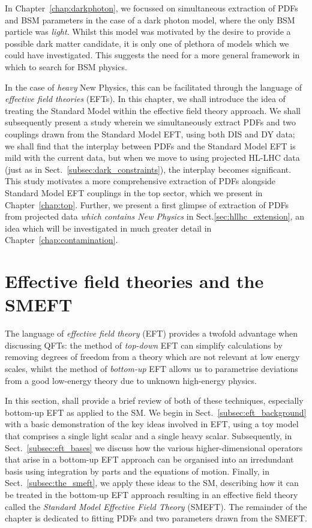 \documentclass[withindex,glossary]{cam-thesis}
\begin{document}
\noindent In Chapter~\ref{chap:darkphoton}, we focussed on simultaneous extraction of PDFs and BSM parameters in the case of a dark photon model, where the only BSM particle was \textit{light}. Whilst this model was motivated by the desire to provide a possible dark matter candidate, it is only one of plethora of models which we could have investigated. This suggests the need for a more general framework in which to search for BSM physics.

In the case of \textit{heavy} New Physics, this can be facilitated through the language of \textit{effective field theories} (EFTs). In this chapter, we shall introduce the idea of treating the Standard Model within the effective field theory approach. We shall subsequently present a study wherein we simultaneously extract PDFs and two couplings drawn from the Standard Model EFT, using both DIS and DY data; we shall find that the interplay between PDFs and the Standard Model EFT is mild with the current data, but when we move to using projected HL-LHC data (just as in Sect.~\ref{subsec:dark_constraints}), the interplay becomes significant. This study motivates a more comprehensive extraction of PDFs alongside Standard Model EFT couplings in the top sector, which we present in Chapter~\ref{chap:top}. Further, we present a first glimpse of extraction of PDFs from projected data \textit{which contains New Physics} in Sect.\ref{sec:hllhc_extension}, an idea which will be investigated in much greater detail in Chapter~\ref{chap:contamination}.

\section{Effective field theories and the SMEFT}
\label{sec:eft_intro}
The language of \textit{effective field theory} (EFT) provides a twofold advantage when discussing QFTs: the method of \textit{top-down} EFT can simplify calculations by removing degrees of freedom from a theory which are not relevant at low energy scales, whilst the method of \textit{bottom-up} EFT allows us to parametrise deviations from a good low-energy theory due to unknown high-energy physics. 

In this section, shall provide a brief review of both of these techniques, especially bottom-up EFT as applied to the SM. We begin in Sect.~\ref{subsec:eft_background} with a basic demonstration of the key ideas involved in EFT, using a toy model that comprises a single light scalar and a single heavy scalar. Subsequently, in Sect.~\ref{subsec:eft_bases} we discuss how the various higher-dimensional operators that arise in a bottom-up EFT approach can be organised into an irredundant basis using integration by parts and the equations of motion. Finally, in Sect.~\ref{subsec:the_smeft}, we apply these ideas to the SM, describing how it can be treated in the bottom-up EFT approach resulting in an effective field theory called the \textit{Standard Model Effective Field Theory} (SMEFT). The remainder of the chapter is dedicated to fitting PDFs and two parameters drawn from the SMEFT.
\end{document}
